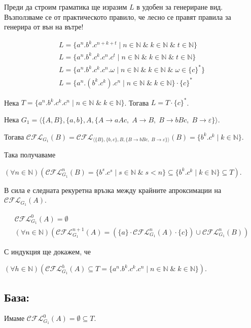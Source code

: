 \documentclass[12pt]{article}
\begin{document}
Преди да строим граматика ще изразим \(L\) в удобен за генериране вид.
Възползваме се от практическото правило, че лесно се правят правила за генерира от вън на вътре!

\begin{align*}
    L = \{a^n.b^k.c^{n + k + t} \mid n \in \mathbb{N} \;\&\; k \in \mathbb{N} \;\&\; t \in \mathbb{N}\} \\
    L = \{a^n.b^k.c^k.c^n.c^t \mid n \in \mathbb{N} \;\&\; k \in \mathbb{N} \;\&\; t \in \mathbb{N}\} \\
    L = \{a^n.b^k.c^k.c^n.\omega \mid n \in \mathbb{N} \;\&\; k \in \mathbb{N} \;\&\; \omega \in \{c\}^*\} \\
    L = \{a^n.(b^k.c^k).c^n \mid n \in \mathbb{N} \;\&\; k \in \mathbb{N} \} \cdot \{c\}^*
\end{align*}

Нека \(T = \{a^n.b^k.c^k.c^n \mid n \in \mathbb{N} \;\&\; k \in \mathbb{N} \}\). Тогава \(L = T \cdot \{c\}^*\).

Нека \(G_1 = \langle \{A, B\}, \{a, b\},  A, \{A \to aAc,\; A \to B,\; B \to bBc,\; B \to \varepsilon\} \rangle\).

Тогава \(\mathcal{CFL}_{G_1}(B) = \mathcal{CFL}_{\langle \{B\}, \{b, c\}, B, \{B \to bBc,\; B \to \varepsilon\} \rangle}(B)
= \{b^k.c^k \mid k \in \mathbb{N}\}\).

Така получаваме

\((\forall n \in \mathbb{N})(\mathcal{CFL}_{G_1}^n(B) = \{b^s.c^s \mid s \in \mathbb{N} \;\&\; s < n\} \subseteq \{b^k.c^k \mid k \in \mathbb{N}\} \subseteq T)\).

\vspace*{5mm}

\par В сила е следната рекуретна връзка между крайните апроксимации на \(\mathcal{CFL}_{G_1}(A)\).

\begin{align*}
    \mathcal{CFL}_{G_1}^0(A) = \emptyset\ \\
    (\forall n \in \mathbb N)(\mathcal{CFL}_{G_1}^{n + 1}(A) = (\{a\} \cdot \mathcal{CFL}_{G_1}^n(A) \cdot \{c\}) \cup \mathcal{CFL}_{G_1}^n(B))
\end{align*}

С индукция ще докажем, че

\((\forall h \in \mathbb{N})(\mathcal{CFL}_{G_1}^h(A) \subseteq T = \{a^n.b^k.c^k.c^n \mid n \in \mathbb{N} \;\&\; k \in \mathbb{N}\})\).

\subsection*{База:}
Имаме \(\mathcal{CFL}_{G_1}^0(A) = \emptyset \subseteq T\).
\end{document}
